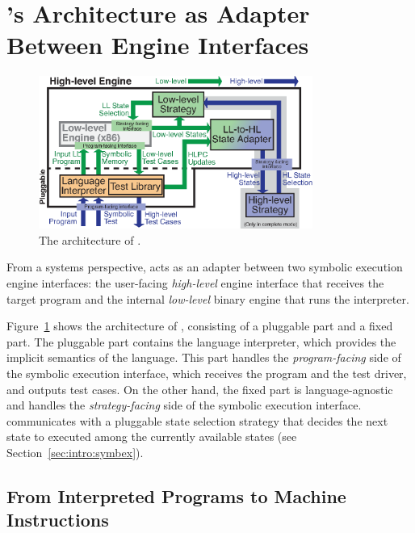 \section{\chef's Architecture as Adapter Between Engine Interfaces}

\begin{figure}
  \centering
  \includegraphics[width=0.8\textwidth]{figures/chef/iface-adapter}
  \caption{The architecture of \chef.}
  \label{fig:chef:arch}
\end{figure}

From a systems perspective, \chef acts as an adapter between two symbolic execution engine interfaces:
%
the user-facing \emph{high-level} engine interface that receives the target program and the internal \emph{low-level} binary engine that runs the interpreter.

Figure~\ref{fig:chef:arch} shows the architecture of \chef, consisting of a pluggable part and a fixed part.
%
The pluggable part contains the language interpreter, which provides the implicit semantics of the language.  This part handles the \emph{program-facing} side of the symbolic execution interface, which receives the program and the test driver, and outputs test cases.
%
On the other hand, the fixed part is language-agnostic and handles the \emph{strategy-facing} side of the symbolic execution interface. \chef communicates with a pluggable state selection strategy that decides the next state to executed among the currently available states (see Section~\ref{sec:intro:symbex}).


\subsection{From Interpreted Programs to Machine Instructions}

